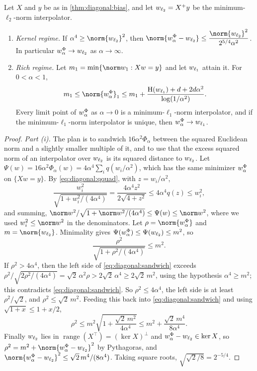 \begin{refsection}
\begin{theorem}\label{thm:diagonal:limits}
Let $X$ and $y$ be as in \cref{thm:diagonal:bias}, and let $w_{\ell_{2}}=X^+y$ be the minimum-$\ell_2$-norm interpolator.
\begin{enumerate}
\item \emph{Kernel regime.} If $\alpha^4\ge\norm{\diagwl2}^2$, then $\displaystyle\norm{\diagwphi-\diagwl2}\le\frac{\norm{\diagwl2}^2}{2^{5/4}\alpha^2}$. In particular $w^\Phi_\alpha\to w_{\ell_{2}}$ as $\alpha\to\infty$.
\item \emph{Rich regime.} Let $m_1=\min\{\norm w_1:Xw=y\}$ and let $w_{\ell_{1}}$ attain it. For $0<\alpha<1$,
\[
  m_1\le\norm{\diagwphi}_1\le m_1+\frac{\diagH(\diagwl1)+d+2d\alpha^2}{\log(1/\alpha^2)} .
\]
Every limit point of $w^\Phi_\alpha$ as $\alpha\to0$ is a minimum-$\ell_1$-norm interpolator, and if the minimum-$\ell_1$-norm interpolator is unique, then $w^\Phi_\alpha\to w_{\ell_{1}}$.
\end{enumerate}
\end{theorem}

\begin{proof}
\emph{Part (i).} The plan is to sandwich $16\alpha^2\Phi_\alpha$ between the squared Euclidean norm and a slightly smaller multiple of it, and to use that the excess squared norm of an interpolator over $w_{\ell_{2}}$ is its squared distance to $w_{\ell_{2}}$. Let $\Psi(w)=16\alpha^2\Phi_\alpha(w)=4\alpha^4\sum_iq(w_i/\alpha^2)$, which has the same minimizer $w^\Phi_\alpha$ on $\{Xw=y\}$. By \eqref{eq:diagonal:qquad}, with $z=w_i/\alpha^2$,
\[
  \frac{w_i^2}{\sqrt{1+w_i^2/(4\alpha^4)}}=\frac{4\alpha^4z^2}{2\sqrt{4+z^2}}\le4\alpha^4q(z)\le w_i^2,
\]
and summing, $\norm w^2/\sqrt{1+\norm w^2/(4\alpha^4)}\le\Psi(w)\le\norm w^2$, where we used $w_i^2\le\norm w^2$ in the denominators. Let $\rho=\norm{\diagwphi}$ and $m=\norm{\diagwl2}$. Minimality gives $\Psi(w^\Phi_\alpha)\le\Psi(w_{\ell_{2}})\le m^2$, so
\begin{equation}\label{eq:diagonal:sandwich}
  \frac{\rho^2}{\sqrt{1+\rho^2/(4\alpha^4)}}\le m^2 .
\end{equation}
If $\rho^2>4\alpha^4$, then the left side of \eqref{eq:diagonal:sandwich} exceeds $\rho^2/\sqrt{2\rho^2/(4\alpha^4)}=\sqrt2\,\alpha^2\rho>2\sqrt2\,\alpha^4\ge2\sqrt2\,m^2$, using the hypothesis $\alpha^4\ge m^2$; this contradicts \eqref{eq:diagonal:sandwich}. So $\rho^2\le4\alpha^4$, the left side is at least $\rho^2/\sqrt2$, and $\rho^2\le\sqrt2\,m^2$. Feeding this back into \eqref{eq:diagonal:sandwich} and using $\sqrt{1+x}\le1+x/2$,
\[
  \rho^2\le m^2\sqrt{1+\frac{\sqrt2\,m^2}{4\alpha^4}}\le m^2+\frac{\sqrt2\,m^4}{8\alpha^4} .
\]
Finally $w_{\ell_{2}}$ lies in $\operatorname{range}(X^\top)=(\ker X)^\perp$ and $w^\Phi_\alpha-w_{\ell_{2}}\in\ker X$, so $\rho^2=m^2+\norm{\diagwphi-\diagwl2}^2$ by Pythagoras, and $\norm{\diagwphi-\diagwl2}^2\le\sqrt2\,m^4/(8\alpha^4)$. Taking square roots, $\sqrt{\sqrt2/8}=2^{-5/4}$.


\end{proof}
\end{refsection}
